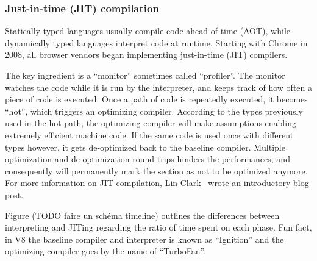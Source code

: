 \subsubsection{Just-in-time (JIT) compilation}%
\label{ssub:just_in_time_jit_compilation}

Statically typed languages usually compile code ahead-of-time (AOT),
while dynamically typed languages interpret code at runtime.
Starting with Chrome in 2008, all browser vendors began implementing
just-in-time (JIT) compilers.

The key ingredient is a ``monitor'' sometimes called ``profiler''.
The monitor watches the code while it is run by the interpreter,
and keeps track of how often a piece of code is executed.
Once a path of code is repeatedly executed, it becomes ``hot'',
which triggers an optimizing compiler.
According to the types previously used in the hot path,
the optimizing compiler will make assumptions enabling
extremely efficient machine code.
If the same code is used once with different types however,
it gets de-optimized back to the baseline compiler.
Multiple optimization and de-optimization round trips
hinders the performances, and consequently will permanently mark
the section as not to be optimized anymore.
For more information on JIT compilation, Lin Clark~\cite{clark-jit}
wrote an introductory blog post.

Figure (\alert{TODO faire un schéma timeline}) outlines the differences between
interpreting and JITing regarding the ratio of time spent on each phase.
Fun fact, in V8 the baseline compiler and interpreter is known as ``Ignition''
and the optimizing compiler goes by the name of ``TurboFan''.

%
%
%


